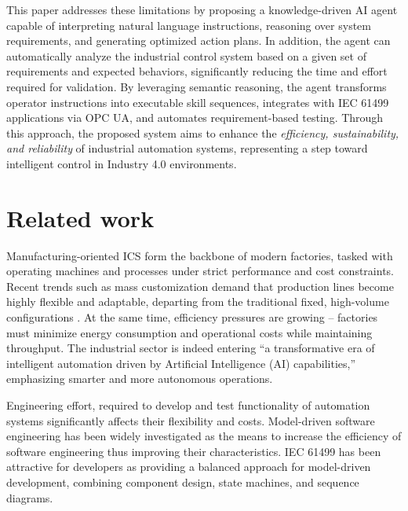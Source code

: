 \documentclass[conference]{IEEEtran}
\begin{document}
This paper addresses these limitations by proposing a knowledge-driven AI agent capable of interpreting natural language instructions, reasoning over system requirements, and generating optimized action plans. In addition, the agent can automatically analyze the industrial control system based on a given set of requirements and expected behaviors, significantly reducing the time and effort required for validation. By leveraging semantic reasoning, the agent transforms operator instructions into executable skill sequences, integrates with IEC 61499 applications via OPC UA, and automates requirement-based testing. Through this approach, the proposed system aims to enhance the \textit{efficiency, sustainability, and reliability} of industrial automation systems, representing a step toward intelligent control in Industry 4.0 environments.



\section{ Related work}
\label{sec:background}

Manufacturing-oriented ICS form the backbone of modern factories, tasked with operating machines and processes under strict performance and cost constraints. Recent trends such as mass customization demand that production lines become highly flexible and adaptable, departing from the traditional fixed, high-volume configurations \cite{9576342}. At the same time, efficiency pressures are growing – factories must minimize energy consumption and operational costs while maintaining throughput. The industrial sector is indeed entering “a transformative era of intelligent automation driven by Artificial Intelligence (AI) capabilities,” emphasizing smarter and more autonomous operations\cite{10677409}. 

Engineering effort, required to develop and test functionality of automation systems significantly affects their flexibility and costs. Model-driven software engineering has been widely investigated as the means to increase the efficiency of software engineering thus improving their characteristics. IEC 61499 has been attractive for developers as providing a balanced approach for model-driven development, combining component design, state machines, and sequence diagrams.
\end{document}
